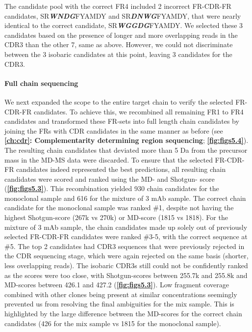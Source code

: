 The candidate pool with the correct FR4 included 2 incorrect FR-CDR-FR candidates, SR\textbf{\emph{WNDG}}FYAMDY and SR\textbf{\emph{DNWG}}FYAMDY, that were nearly identical to the correct candidate, SR\textbf{\emph{WGGDG}}FYAMDY. We selected these 3 candidates based on the presence of longer and more overlapping reads in the CDR3 than the other 7, same as above. However, we could not discriminate between the 3 isobaric candidates at this point, leaving 3 candidates for the CDR3.


\paragraph{Full chain sequencing}
We next expanded the scope to the entire target chain to verify the selected FR-CDR-FR candidates. To achieve this, we recombined all remaining FR1 to FR4 candidates and transformed these FR-sets into full length chain candidates by joining the FRs with CDR candidates in the same manner as before (see \textbf{\autoref{ch:cdr}: Complementarity determining region sequencing}; \textbf{\autoref{fig:figs5.4}}). The resulting chain candidates that deviated more than 5 Da from the precursor mass in the MD-MS data were discarded. To ensure that the selected FR-CDR-FR candidates indeed represented the best predictions, all resulting chain candidates were scored and ranked using the MD- and Shotgun- score (\textbf{\autoref{fig:figs5.3}}).
This recombination yielded 930 chain candidates for the monoclonal sample and 616 for the mixture of 3 mAb sample. The correct chain candidate for the monoclonal sample was ranked \#1, despite not having the highest Shotgun-score (267k vs 270k) or MD-score (1815 vs 1818). For the mixture of 3 mAb sample, the chain candidates made up solely out of previously selected FR-CDR-FR candidates were ranked \#3-5, with the correct sequence at \#5. The top 2 candidates had CDR3 sequences that were previously rejected in the CDR sequencing stage, which were again rejected on the same basis (shorter, less overlapping reads). The isobaric CDR3s still could not be confidently ranked as the scores were too close, with Shotgun-scores between 255.7k and 255.8k and MD-scores between 426.1 and 427.2 (\textbf{\autoref{fig:figs5.3}}). Low fragment coverage combined with other clones being present at similar concentrations seemingly prevented us from resolving the final ambiguities for the mix sample. This is highlighted by the large difference between the MD-scores for the correct chain candidates (426 for the mix sample vs 1815 for the monoclonal sample).


